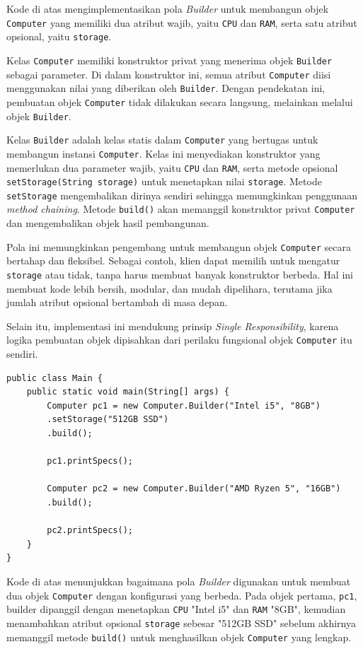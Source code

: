 Kode di atas mengimplementasikan pola \textit{Builder} untuk membangun objek \texttt{Computer} yang memiliki dua atribut wajib, yaitu \texttt{CPU} dan \texttt{RAM}, serta satu atribut opsional, yaitu \texttt{storage}. 

Kelas \texttt{Computer} memiliki konstruktor privat yang menerima objek \texttt{Builder} sebagai parameter. Di dalam konstruktor ini, semua atribut \texttt{Computer} diisi menggunakan nilai yang diberikan oleh \texttt{Builder}. Dengan pendekatan ini, pembuatan objek \texttt{Computer} tidak dilakukan secara langsung, melainkan melalui objek \texttt{Builder}.

Kelas \texttt{Builder} adalah kelas statis dalam \texttt{Computer} yang bertugas untuk membangun instansi \texttt{Computer}. Kelas ini menyediakan konstruktor yang memerlukan dua parameter wajib, yaitu \texttt{CPU} dan \texttt{RAM}, serta metode opsional \texttt{setStorage(String storage)} untuk menetapkan nilai \texttt{storage}. Metode \texttt{setStorage} mengembalikan dirinya sendiri sehingga memungkinkan penggunaan \textit{method chaining}. Metode \texttt{build()} akan memanggil konstruktor privat \texttt{Computer} dan mengembalikan objek hasil pembangunan.

Pola ini memungkinkan pengembang untuk membangun objek \texttt{Computer} secara bertahap dan fleksibel. Sebagai contoh, klien dapat memilih untuk mengatur \texttt{storage} atau tidak, tanpa harus membuat banyak konstruktor berbeda. Hal ini membuat kode lebih bersih, modular, dan mudah dipelihara, terutama jika jumlah atribut opsional bertambah di masa depan.

Selain itu, implementasi ini mendukung prinsip \textit{Single Responsibility}, karena logika pembuatan objek dipisahkan dari perilaku fungsional objek \texttt{Computer} itu sendiri.


\begin{lstlisting}[style=JavaStyle, caption={Penggunaan Builder untuk Membuat Objek Computer}, label={lst:builder-main}]
public class Main {
	public static void main(String[] args) {
		Computer pc1 = new Computer.Builder("Intel i5", "8GB")
		.setStorage("512GB SSD")
		.build();
		
		pc1.printSpecs();
		
		Computer pc2 = new Computer.Builder("AMD Ryzen 5", "16GB")
		.build();
		
		pc2.printSpecs();
	}
}
\end{lstlisting}

Kode di atas menunjukkan bagaimana pola \textit{Builder} digunakan untuk membuat dua objek \texttt{Computer} dengan konfigurasi yang berbeda. Pada objek pertama, \texttt{pc1}, builder dipanggil dengan menetapkan \texttt{CPU} "Intel i5" dan \texttt{RAM} "8GB", kemudian menambahkan atribut opsional \texttt{storage} sebesar "512GB SSD" sebelum akhirnya memanggil metode \texttt{build()} untuk menghasilkan objek \texttt{Computer} yang lengkap.

